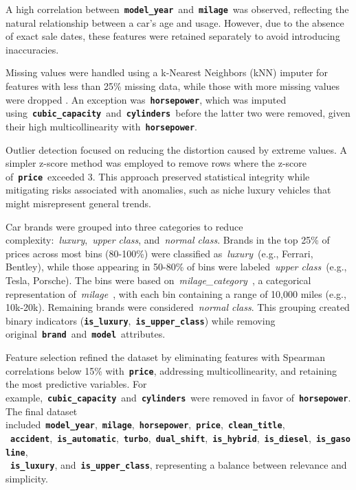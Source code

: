 \documentclass[a4paper,oneside,bibliography=totoc]{scrbook}
\begin{document}
A high correlation between~\textbf{\texttt{model\_year}}~and~\textbf{\texttt{milage}}~was observed, reflecting the natural relationship between a car's age and usage. However, due to the absence of exact sale dates, these features were retained separately to avoid introducing inaccuracies.

Missing values were handled using a k-Nearest Neighbors (kNN) imputer for features with less than 25\% missing data, while those with more missing values were dropped \cite{jadhav2019}. An exception was~\textbf{\texttt{horsepower}}, which was imputed using~\textbf{\texttt{cubic\_capacity}}~and~\textbf{\texttt{cylinders}}~before the latter two were removed, given their high multicollinearity with~\textbf{\texttt{horsepower}}.

Outlier detection focused on reducing the distortion caused by extreme values. A simpler z-score method was employed to remove rows where the z-score of~\textbf{\texttt{price}}~exceeded 3. This approach preserved statistical integrity while mitigating risks associated with anomalies, such as niche luxury vehicles that might misrepresent general trends.

Car brands were grouped into three categories to reduce complexity:~\emph{luxury},~\emph{upper class}, and~\emph{normal class}. Brands in the top 25\% of prices across most bins (80-100\%) were classified as~\emph{luxury}~(e.g., Ferrari, Bentley), while those appearing in 50-80\% of bins were labeled~\emph{upper class}~(e.g., Tesla, Porsche). The bins were based on~\emph{milage_category}~, a categorical representation of~\emph{milage}~, with each bin containing a range of 10,000 miles (e.g., 10k-20k). Remaining brands were considered~\emph{normal class}. This grouping created binary indicators (\textbf{\texttt{is\_luxury}},~\textbf{\texttt{is\_upper\_class}}) while removing original~\textbf{\texttt{brand}}~and~\textbf{\texttt{model}}~attributes.

Feature selection refined the dataset by eliminating features with Spearman correlations below 15\% with~\textbf{\texttt{price}}, addressing multicollinearity, and retaining the most predictive variables. For example,~\textbf{\texttt{cubic\_capacity}}~and~\textbf{\texttt{cylinders}}~were removed in favor of~\textbf{\texttt{horsepower}}. The final dataset included~\textbf{\texttt{model\_year}},~\textbf{\texttt{milage}},~\textbf{\texttt{horsepower}},~\textbf{\texttt{price}},~\textbf{\texttt{clean\_title}},\\~\textbf{\texttt{accident}},~\textbf{\texttt{is\_automatic}},~\textbf{\texttt{turbo}},~\textbf{\texttt{dual\_shift}},~\textbf{\texttt{is\_hybrid}},~\textbf{\texttt{is\_diesel}},~\textbf{\texttt{is\_gasoline}},\\~\textbf{\texttt{is\_luxury}}, and~\textbf{\texttt{is\_upper\_class}}, representing a balance between relevance and simplicity.
\end{document}
